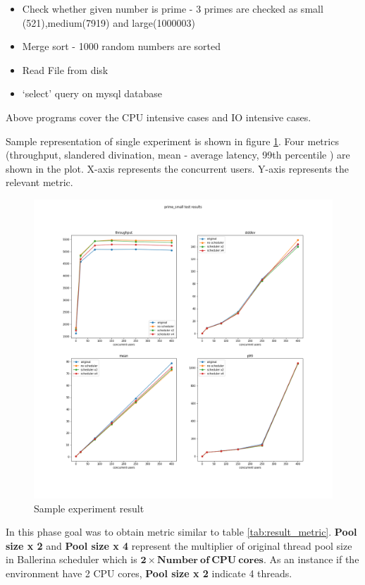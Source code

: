   \begin{itemize}
  	\item Check whether given number is prime - 3 primes are checked as small (521),medium(7919) and large(1000003)
  	\item Merge sort - 1000 random numbers are sorted
  	\item Read File from disk
  	\item ‘select’ query on mysql database
  \end{itemize} 
Above programs cover the CPU intensive cases and IO intensive cases. 

Sample representation of single experiment is shown in figure \ref{sample_result}. Four metrics (throughput, slandered divination, mean - average latency, 99th percentile  ) are shown in the plot. X-axis represents the concurrent users. Y-axis represents the  relevant metric. 

 \begin{figure}[htbp]
 	\begin{center}
 		\includegraphics[scale=0.35]{figures/prime_small test results.png}
 	\end{center}
 	\caption{Sample experiment result}
 	\label{sample_result}
 \end{figure}

In this phase goal was to obtain metric similar to table \ref{tab:result_metric}. \textbf{Pool size x 2} and \textbf{Pool size x 4} represent the multiplier of original thread pool size in Ballerina scheduler which is \textbf{$ \boldsymbol{2} \times \boldsymbol{Number\: of\: CPU\: cores}$}. As an instance if the environment have 2 CPU cores,  \textbf{Pool size x 2} indicate 4 threads.


